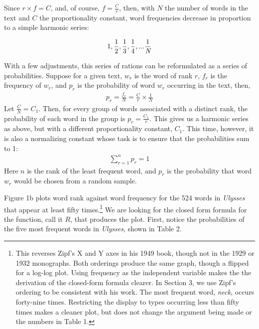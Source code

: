 \documentclass[12pt]{article}
\begin{document}
Since $r\times f = C$, and, of course, $f = \frac{C}{r}$, then, with $N$ the number of words in the text and $C$ the proportionality constant, word frequencies decrease in proportion to a simple harmonic series:


\begin{align}
1,\frac{1}{2},\frac{1}{3},\frac{1}{4},...\frac{1}{\emph{N}}
\end{align}
\noindent

With a few adjustments, this series of rations can be reformulated as a series of probabilities. Suppose for a given text, $w_r$ is the word of rank $r$, $f_r$ is the frequency of $w_r$, and $p_r$ is the probability of word $w_r$ occurring in the text, then,
\begin{align}
p_r=\frac{f_r}{N}=\frac{C}{r}\times\frac{1}{N}
\end{align}
\noindent
Let $\frac{C}{N} = C_1$.  Then, for every group of words associated with a distinct rank, the probability of each word in the group is $p_r = \frac{C_1}{r}$.  This gives us a harmonic series as above, but with a different proportionality constant, $C_1$. This time, however, it is also a normalizing constant whose task is to ensure that the probabilities sum to 1:
\begin{align}
\sum_{r=1}^{n} p_r = 1
\end{align}
\noindent
Here $n$ is the rank of the least frequent word, and $p_r$ is the probability that word $w_r$ would be chosen from a random sample.  

Figure 1b plots word rank against word frequency for the 524 words in \emph{Ulysses} that appear at least fifty times.\footnote[5]{This reverses Zipf's X and Y axes in his 1949 book, though not in the 1929 or 1932 monographs.  Both orderings produce the same graph, though a flipped for a log-log plot. Using frequency as the independent variable makes the the derivation of the closed-form formula clearer.  In Section 3, we use Zipf's ordering to be consistent with his work. The  most frequent word, \emph{neck}, occurs forty-nine times. Restricting the display to types occurring less than fifty times makes a cleaner plot, but does not change the argument being made or the numbers in Table 1.}  We are looking for the closed form formula for the function, call it $R$, that produces the plot.  First, notice the probabilities of the five most frequent words in \emph{Ulysses}, shown in Table 2.  
\end{document}
